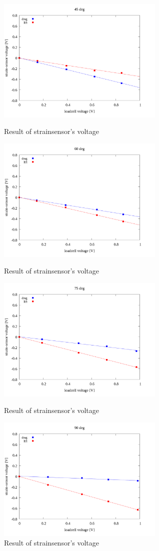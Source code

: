 \documentclass[twocolumn,a4j]{jsarticle}
\begin{document}
\begin{figure}[htbp]
    \footnotesize
    \begin{center}
        \includegraphics[width=80mm]{../images/45_linear.png}
        \caption{Result of strainsensor's voltage}
        \includegraphics[width=80mm]{../images/60_linear.png}
        \caption{Result of strainsensor's voltage}
        \includegraphics[width=80mm]{../images/75_linear.png}
        \caption{Result of strainsensor's voltage}
        \includegraphics[width=80mm]{../images/90_linear.png}
        \caption{Result of strainsensor's voltage}
    \end{center}
\end{figure}
\end{document}
